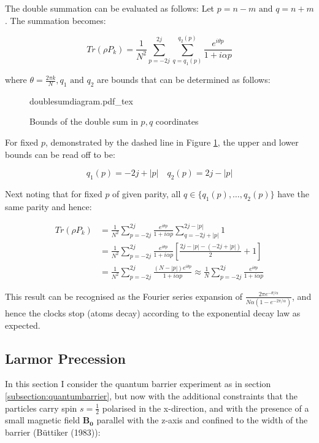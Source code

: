 \documentclass{article}
\newcommand{\incfig}[1]{%
    \def\svgwidth{10cm}
    {#1.pdf_tex}
}
\begin{document}
\noindent The double summation can be evaluated as follows: Let $p=n-m \text{ and } q=n+m$. The summation becomes:

\begin{equation}
	Tr(\rho P_k) = \frac{1}{N^2}\sum_{p=-2j}^{2j}\sum_{q=q_1(p)}^{q_2(p)}\frac{e^{i\theta p}}{1+i\alpha p}
\end{equation}

\noindent where $\theta = \frac{2\pi k}{N}, q_1 \text{ and } q_2$ are bounds that can be determined as follows:

\begin{figure}[ht]
    \centering
    \incfig{doublesumdiagram}
    \caption{Bounds of the double sum in $p,q$ coordinates}
    \label{fig:doublesumdiagram}
\end{figure}

\noindent For fixed $p$, demonstrated by the dashed line in Figure \ref{fig:doublesumdiagram}, the upper and lower bounds can be read off to be:

\begin{equation}
	q_1(p)=-2j+|p| \quad q_2(p)=2j-|p|
\end{equation}

\noindent Next noting that for fixed $p$ of given parity, all $q \in \{q_1(p),\dots,q_2(p)\}$ have the same parity and hence:

\begin{subequations}
\begin{align}
	Tr(\rho P_k) &= \frac{1}{N^2}\sum_{p=-2j}^{2j}\frac{e^{i\theta p}}{1+i\alpha p}\sum_{q=-2j+|p|}^{2j-|p|}1 \\
		     &= \frac{1}{N^2}\sum_{p=-2j}^{2j}\frac{e^{i\theta p}}{1+i\alpha p}\left[\frac{2j-|p|-(-2j+|p|)}{2}+1\right] \\
		     &= \frac{1}{N^2}\sum_{p=-2j}^{2j}\frac{(N-|p|)e^{i\theta p}}{1+i\alpha p} \approx \frac{1}{N}\sum_{p=-2j}^{2j}\frac{e^{i\theta p}}{1+i\alpha p}
\end{align}
\end{subequations}

\noindent This result can be recognised as the Fourier series expansion of $\frac{2\pi e^{-\theta/\alpha}}{N\alpha\left(1-e^{-2\pi/\alpha}\right)}$, and hence the clocks stop (atoms decay) according to the exponential decay law as expected.

\subsection{Larmor Precession}
\label{subsection:larmorprecession}
In this section I consider the quantum barrier experiment as in section \ref{subsection:quantumbarrier}, but now with the additional constraints that the particles carry spin $s=\frac{1}{2}$ polarised in the x-direction, and with the presence of a small magnetic field $\boldsymbol{B_0}$ parallel with the z-axis and confined to the width of the barrier (B{\"u}ttiker (1983)):
\end{document}
